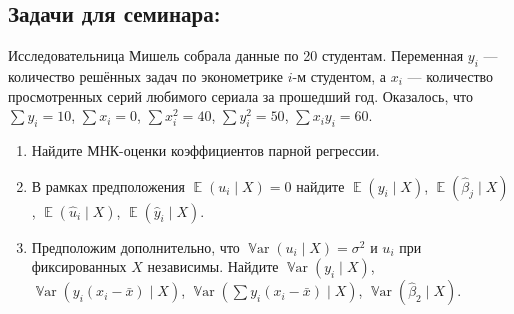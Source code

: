 \documentclass[12pt]{article}
\DeclareMathOperator{\Var}{\mathbb{V}ar}
\DeclareMathOperator{\E}{\mathbb{E}}
\newcommand{\hb}{\hat{\beta}}
\begin{document}
\subsection{Задачи для семинара:}
\begin{problem}
Исследовательница Мишель собрала данные по 20 студентам. 
Переменная $y_i$ — количество решённых задач по эконометрике $i$-м студентом, 
а $x_i$ — количество просмотренных серий любимого сериала за прошедший год. 
Оказалось, что $\sum y_i = 10$, $\sum x_i = 0$, $\sum x_i^2 = 40$, $\sum y_i^2 = 50$, $\sum x_i y_i = 60$.

\begin{enumerate}
\item Найдите МНК-оценки коэффициентов парной регрессии.
\item В рамках предположения $\E(u_i \mid X) = 0$ найдите $\E(y_i \mid X)$, $\E(\hb_j \mid X)$, $\E(\hat u_i \mid X)$, $\E(\hat y_i \mid X)$.
\item Предположим дополнительно, что $\Var(u_i \mid X)=\sigma^2$ и $u_i$ при фиксированных $X$ независимы. 
Найдите $\Var(y_i \mid X)$, $\Var(y_i (x_i - \bar x) \mid X)$, $\Var(\sum y_i (x_i - \bar x) \mid X)$, $\Var(\hb_2 \mid X)$.
\end{enumerate}
\begin{sol}
  \end{sol}
\end{problem}
\end{document}
